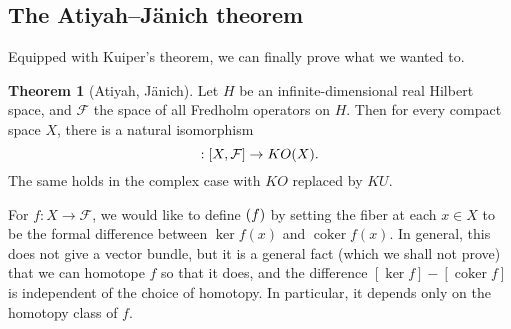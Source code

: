 \documentclass{shortart}
\theoremstyle{definition}
\newtheorem*{thm}{Theorem}
\let\index\relax
\DeclareMathOperator{\coker}{coker}
\DeclareMathOperator{\index}{idx}
\newcommand\GL{\mathrm{GL}}
\begin{document}
%
%
%

\subsection{The Atiyah--J\"anich theorem}
Equipped with Kuiper's theorem, we can finally prove what we wanted to.
\begin{thm}[Atiyah, J\"anich]
  Let $H$ be an infinite-dimensional real Hilbert space, and $\mathcal{F}$ the space of all Fredholm operators on $H$. Then for every compact space $X$, there is a natural isomorphism
  \[
    \index: [X, \mathcal{F}] \to KO(X).
  \]
  The same holds in the complex case with $KO$ replaced by $KU$.
\end{thm}

For $f: X \to \mathcal{F}$, we would like to define $\index(f)$ by setting the fiber at each $x \in X$ to be the formal difference between $\ker f(x)$ and $\coker f(x)$. In general, this does not give a vector bundle, but it is a general fact (which we shall not prove) that we can homotope $f$ so that it does, and the difference $[\ker f] - [\coker f]$ is independent of the choice of homotopy. In particular, it depends only on the homotopy class of $f$.
\end{document}
